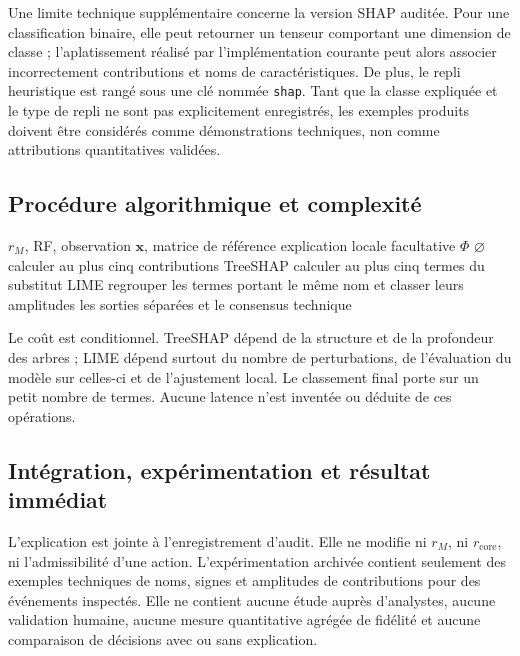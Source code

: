 \documentclass[11pt,a4paper,oneside]{report}
\theoremstyle{definition}
\theoremstyle{plain}
\begin{document}
Une limite technique supplémentaire concerne la version SHAP auditée. Pour
une classification binaire, elle peut retourner un tenseur comportant une
dimension de classe ; l'aplatissement réalisé par l'implémentation courante
peut alors associer incorrectement contributions et noms de caractéristiques.
De plus, le repli heuristique est rangé sous une clé nommée
\texttt{shap}. Tant que la classe expliquée et le type de repli ne sont pas
explicitement enregistrés, les exemples produits doivent être considérés
comme démonstrations techniques, non comme attributions quantitatives
validées.

\subsection*{Procédure algorithmique et complexité}

\begin{algorithm}[H]
\caption{Explication RF conditionnelle}
\label{alg:ai-ro-xai}
\begin{algorithmic}[1]
\Require $r_M$, RF, observation $\mathbf{x}$, matrice de référence
\Ensure explication locale facultative $\Phi$
  \State \Return $\varnothing$
\EndIf
\State calculer au plus cinq contributions TreeSHAP
\State calculer au plus cinq termes du substitut LIME
\State regrouper les termes portant le même nom et classer leurs amplitudes
\State \Return les sorties séparées et le consensus technique
\end{algorithmic}
\end{algorithm}

Le coût est conditionnel. TreeSHAP dépend de la structure et de la profondeur des arbres ; LIME dépend surtout du nombre de perturbations, de l'évaluation du modèle sur celles-ci et de l'ajustement local. Le classement final porte sur un petit nombre de termes. Aucune latence n'est inventée ou déduite de ces opérations.

\subsection*{Intégration, expérimentation et résultat immédiat}

L'explication est jointe à l'enregistrement d'audit. Elle ne modifie ni $r_M$, ni $r_{\mathrm{core}}$, ni l'admissibilité d'une action. L'expérimentation archivée contient seulement des exemples techniques de noms, signes et amplitudes de contributions pour des événements inspectés. Elle ne contient aucune étude auprès d'analystes, aucune validation humaine, aucune mesure quantitative agrégée de fidélité et aucune comparaison de décisions avec ou sans explication.
\end{document}
